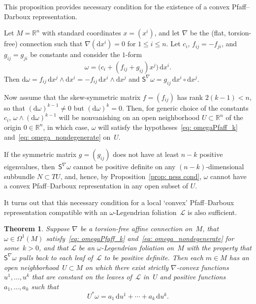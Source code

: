 \documentclass[pdftex]{sigma}
\renewcommand{\d}{\mathrm{d}}%
\newcommand{\cL}{{\mathcal L}}
\newcommand{\Ss}{\mathsf{S}}
\newcommand{\w}{\wedge}
\numberwithin{equation}{section}
\newtheorem{Theorem}{Theorem}[section]
\begin{document}
This proposition provides necessary condition for the existence
of a convex Pfaff--Darboux representation.

\begin{Example}\label{ex: Obstruction}
Let $M=\mathbb{R}^n$ with standard coordinates $x=(x^i)$,
and let $\nabla$ be the (flat, torsion-free) connection
such that $\nabla(\d x^i)=0$ for $1\le i\le n$.
Let $c_i$, $f_{ij}=-f_{ji}$, and $g_{ij}=g_{ji}$
be constants and consider the $1$-form
\[
\omega = \bigl(c_i + (f_{ij}+g_{ij})x^j)\,\d x^i.
\]
Then $\d\omega= f_{ij}\,\d x^j\w\d x^i = - f_{ij}\,\d x^i\w\d x^j$
and $\Ss^\nabla\omega = g_{ij}\,\d x^i\circ\d x^j$.

Now assume that the skew-symmetric matrix $f = (f_{ij})$
has rank $2(k{-}1)<n$, so that $(\d\omega)^{k-1}\not=0$
but $(\d\omega)^{k}=0$.
Then, for generic choice of the constants $c_i$,
$\omega\w(\d\omega)^{k-1}$ will be nonvanishing on an open neighborhood $U\subset\mathbb{R}^n$ of the origin $0\in\mathbb{R}^n$,
in which case, $\omega$ will satisfy the hypotheses~\eqref{eq: omegaPfaff_k}
and~\eqref{eq: omega_nondegenerate} on~$U$.

If the symmetric matrix $g = (g_{ij})$
does not have at least $n{-}k$ positive eigenvalues,
then~$\Ss^\nabla\omega$ cannot be positive definite on
any $(n{-}k)$-dimensional subbundle $N\subset TU$, and, hence,
by Proposition~\ref{prop: ness cond}, $\omega$ cannot have a convex Pfaff--Darboux
representation in any open subset of $U$.
\end{Example}

It turns out that this necessary condition
for a local `convex' Pfaff--Darboux representation compatible
with an $\omega$-Legendrian foliation~$\cL$ is also sufficient.

\begin{Theorem}\label{thm: main}
Suppose $\nabla$ be a torsion-free affine
connection on~$M$, that $\omega\in\Omega^1(M)$
satisfy~\eqref{eq: omegaPfaff_k} and~\eqref{eq: omega_nondegenerate}
for some~$k>0$, and that $\cL$ be an $\omega$-Legendrian
foliation on~$M$ with the property that $\Ss^\nabla\omega$
pulls back to each leaf of~$\cL$ to be positive definite.
Then each $m\in M$ has an open neighborhood~$U\subset M$
on which there exist strictly $\nabla$-convex functions~$u^1,\ldots,u^k$
that are constant on the leaves of~$\cL$ in~$U$
and positive functions~$a_1,\ldots, a_k$ such that
\begin{equation*}
U^*\omega = a_1\,\d u^1 + \cdots + a_k\,\d u^k.
\end{equation*}
\end{Theorem}
\end{document}
